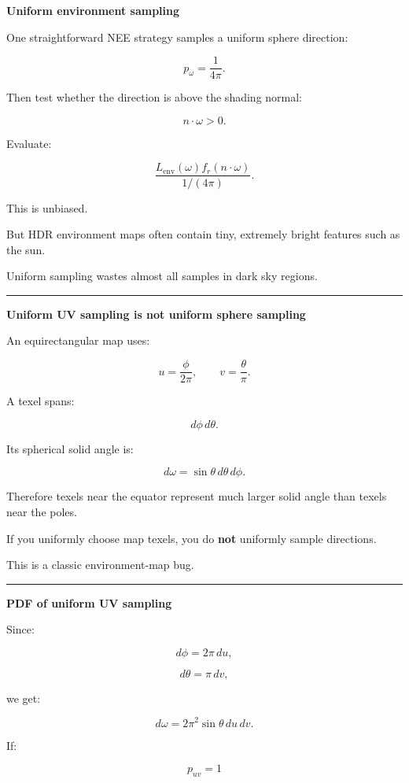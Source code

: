 \textbf{Uniform environment sampling}

One straightforward NEE strategy samples a uniform sphere direction:

\[
p_\omega
=
\frac1{4\pi}.
\]

Then test whether the direction is above the shading normal:

\[
n\cdot\omega>0.
\]

Evaluate:

\[
\frac{
L_{\text{env}}(\omega)
f_r
(n\cdot\omega)
}{
1/(4\pi)
}.
\]

This is unbiased.

But HDR environment maps often contain tiny, extremely bright features such as the sun.

Uniform sampling wastes almost all samples in dark sky regions.

\begin{center}\rule{0.5\linewidth}{0.5pt}\end{center}

\textbf{Uniform UV sampling is not uniform sphere sampling}

An equirectangular map uses:

\[
u=\frac{\phi}{2\pi},
\qquad
v=\frac{\theta}{\pi}.
\]

A texel spans:

\[
d\phi\,d\theta.
\]

Its spherical solid angle is:

\[
\boxed{
d\omega
=
\sin\theta
\,d\theta\,d\phi.
}
\]

Therefore texels near the equator represent much larger solid angle than texels near the poles.

If you uniformly choose map texels, you do \textbf{not} uniformly sample directions.

This is a classic environment-map bug.

\begin{center}\rule{0.5\linewidth}{0.5pt}\end{center}

\textbf{PDF of uniform UV sampling}

Since:

\[
d\phi=2\pi\,du,
\]

\[
d\theta=\pi\,dv,
\]

we get:

\[
d\omega
=
2\pi^2
\sin\theta
\,du\,dv.
\]

If:

\[
p_{uv}=1
\]

